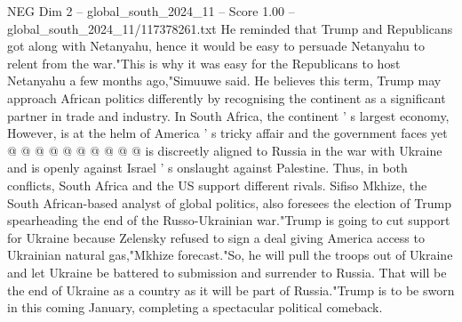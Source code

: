 \begin{textsample}{NEG Dim 2 – global\_south\_2024\_11 – Score 1.00 – global\_south\_2024\_11/117378261.txt}
He reminded that Trump and Republicans got along with Netanyahu, hence it would be easy to persuade Netanyahu to relent from the war."This is why it was easy for the Republicans to host Netanyahu a few months ago,"Simuuwe said.
He believes this term, Trump may approach African politics differently by recognising the continent as a significant partner in trade and industry.
In South Africa, the continent ' s largest economy, However, is at the helm of America ' s tricky affair and the government faces yet @ @ @ @ @ @ @ @ @ @ is discreetly aligned to Russia in the war with Ukraine and is openly against Israel ' s onslaught against Palestine.
Thus, in both conflicts, South Africa and the US support different rivals.
Sifiso Mkhize, the South African-based analyst of global politics, also foresees the election of Trump spearheading the end of the Russo-Ukrainian war."Trump is going to cut support for Ukraine because Zelensky refused to sign a deal giving America access to Ukrainian natural gas,"Mkhize forecast."So, he will pull the troops out of Ukraine and let Ukraine be battered to submission and surrender to Russia.
That will be the end of Ukraine as a country as it will be part of Russia."Trump is to be sworn in this coming January, completing a spectacular political comeback.

\end{textsample}
